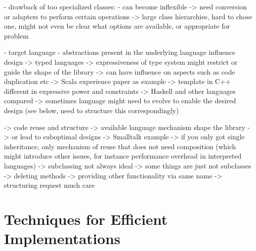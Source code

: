 \documentclass[sigconf, 10pt]{acmart}
\begin{document}
\begin{note}
    - drawback of too specialized classes:
      - can become inflexible
        -> need conversion or adapters to perform certain operations
        -> large class hierarchies, hard to chose one, might not even be
           clear what options are available, or appropriate for problem
     

- target language
 - abstractions present in the underlying language influence design
   -> typed languages
     -> expressiveness of type system might restrict or guide the shape
        of the library
     -> can have influence on aspects such as code duplication etc
     -> Scala experience paper as example
     -> template in C++ different in expressive power and constraints
     -> Haskell and other languages compared \citep{Garcia:2007}
       -> sometimes language might need to evolve to enable the desired design \citep{Chakravarty:2005:ATC} \citep{Black:2003:ATS} (see below, need to structure this correspondingly)
       
  -> code reuse and structure
    -> available language mechanism shape the library
    -> or lead to suboptimal designs
     -> Smalltalk example \citep{Cook:1992:ISS}
       -> if you only got single inheritance, only mechanism of reuse
          that does not need composition (which might introduce other issues,
          for instance performance overhead in interpreted languages)
       -> subclassing not always ideal
       -> some things are just not subclasses
         -> deleting methods
         -> providing other functionality via same name
         -> structuring request much care
         
       
  
\end{note}


\section{Techniques for Efficient Implementations}
\end{document}
